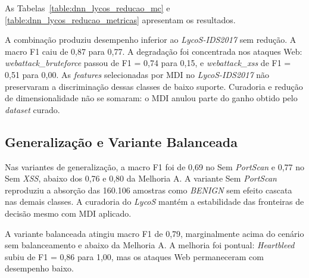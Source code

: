 As Tabelas~\ref{table:dnn_lycos_reducao_mc} e \ref{table:dnn_lycos_reducao_metricas} apresentam os resultados.





A combinação produziu desempenho inferior ao \textit{LycoS-IDS2017} sem redução. A macro F1 caiu de 0,87 para 0,77. A degradação foi concentrada nos ataques Web: \textit{webattack\_bruteforce} passou de F1 = 0,74 para 0,15, e \textit{webattack\_xss} de F1 = 0,51 para 0,00. As \textit{features} selecionadas por MDI no \textit{LycoS-IDS2017} não preservaram a discriminação dessas classes de baixo suporte. Curadoria e redução de dimensionalidade não se somaram: o MDI anulou parte do ganho obtido pelo \textit{dataset} curado.

\subsection{Generalização e Variante Balanceada}













Nas variantes de generalização, a macro F1 foi de 0,69 no Sem \textit{PortScan} e 0,77 no Sem \textit{XSS}, abaixo dos 0,76 e 0,80 da Melhoria A. A variante Sem \textit{PortScan} reproduziu a absorção das 160.106 amostras como \textit{BENIGN} sem efeito cascata nas demais classes. A curadoria do \textit{LycoS} mantém a estabilidade das fronteiras de decisão mesmo com MDI aplicado.

A variante balanceada atingiu macro F1 de 0,79, marginalmente acima do cenário sem balanceamento e abaixo da Melhoria A. A melhoria foi pontual: \textit{Heartbleed} subiu de F1 = 0,86 para 1,00, mas os ataques Web permaneceram com desempenho baixo.

